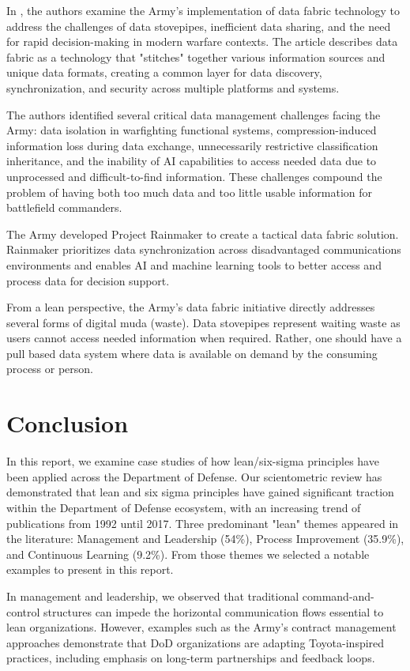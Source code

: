 \documentclass{article}
\begin{document}
		In \cite{Patel2021}, the authors examine the Army's implementation of data fabric technology to address the challenges of data stovepipes, inefficient data sharing, and the need for rapid decision-making in modern warfare contexts.
		The article describes data fabric as a technology that "stitches" together various information sources and unique data formats, creating a common layer for data discovery, synchronization, and security across multiple platforms and systems.

		The authors identified several critical data management challenges facing the Army: data isolation in warfighting functional systems, compression-induced information loss during data exchange, unnecessarily restrictive classification inheritance, and the inability of AI capabilities to access needed data due to unprocessed and difficult-to-find information.
		These challenges compound the problem of having both too much data and too little usable information for battlefield commanders.

		The Army developed Project Rainmaker to create a tactical data fabric solution.
		Rainmaker prioritizes data synchronization across disadvantaged communications environments and enables AI and machine learning tools to better access and process data for decision support.

		From a lean perspective, the Army's data fabric initiative directly addresses several forms of digital muda (waste).
		Data stovepipes represent waiting waste as users cannot access needed information when required.
		Rather, one should have a pull based data system where data is available on demand by the consuming process or person.

	\section{Conclusion}

	In this report, we examine case studies of how lean/six-sigma principles have been applied across the Department of Defense.
	Our scientometric review has demonstrated that lean and six sigma principles have gained significant traction within the Department of Defense ecosystem, with an increasing trend of publications from 1992 until 2017. 
	Three predominant "lean" themes appeared in the literature: Management and Leadership (54\%), Process Improvement (35.9\%), and Continuous Learning (9.2\%). 
	From those themes we selected a notable examples to present in this report.

	In management and leadership, we observed that traditional command-and-control structures can impede the horizontal communication flows essential to lean organizations.
	However, examples such as the Army's contract management approaches demonstrate that DoD organizations are adapting Toyota-inspired practices, including emphasis on long-term partnerships and feedback loops.
\end{document}
